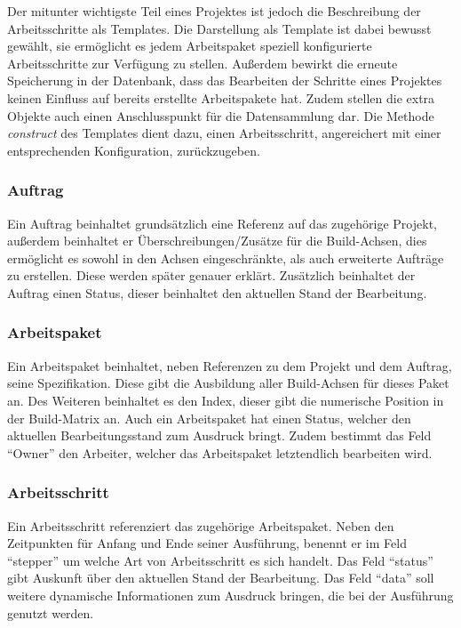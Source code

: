 Der mitunter wichtigste Teil eines Projektes ist jedoch die Beschreibung der Arbeitsschritte als Templates.
Die Darstellung als Template ist dabei bewusst gewählt,
sie ermöglicht es jedem Arbeitspaket speziell konfigurierte Arbeitsschritte zur Verfügung zu stellen.
Außerdem bewirkt die erneute Speicherung in der Datenbank,
dass das Bearbeiten der Schritte eines Projektes keinen Einfluss auf bereits erstellte Arbeitspakete hat.
Zudem stellen die extra Objekte auch einen Anschlusspunkt für die Datensammlung dar.
Die Methode \textit{construct} des Templates dient dazu,
einen Arbeitsschritt, angereichert mit einer entsprechenden Konfiguration, zurückzugeben.

\subsubsection{Auftrag}

Ein Auftrag beinhaltet grundsätzlich eine Referenz auf das zugehörige Projekt,
außerdem beinhaltet er Überschreibungen/Zusätze für die Build-Achsen,
dies ermöglicht es sowohl in den Achsen eingeschränkte,
als auch erweiterte Aufträge zu erstellen.
Diese werden später genauer erklärt.
Zusätzlich beinhaltet der Auftrag einen Status, dieser beinhaltet den aktuellen Stand der Bearbeitung.

\subsubsection{Arbeitspaket}
Ein Arbeitspaket beinhaltet, neben Referenzen zu dem Projekt und dem Auftrag,
seine Spezifikation. Diese gibt die Ausbildung aller Build-Achsen für dieses Paket an.
Des Weiteren beinhaltet es den Index, dieser gibt die numerische Position in der Build-Matrix an.
Auch ein Arbeitspaket hat einen Status, welcher den aktuellen Bearbeitungsstand zum Ausdruck bringt.
Zudem bestimmt das Feld ``Owner'' den Arbeiter, welcher das Arbeitspaket letztendlich bearbeiten wird.

\subsubsection{Arbeitsschritt}

Ein Arbeitsschritt referenziert das zugehörige Arbeitspaket.
Neben den Zeitpunkten für Anfang und Ende seiner Ausführung,
benennt er im Feld ``stepper'' um welche Art von Arbeitsschritt es sich handelt.
Das Feld ``status'' gibt Auskunft über den aktuellen Stand der Bearbeitung.
Das Feld ``data'' soll weitere dynamische Informationen zum Ausdruck bringen,
die bei der Ausführung genutzt werden.

